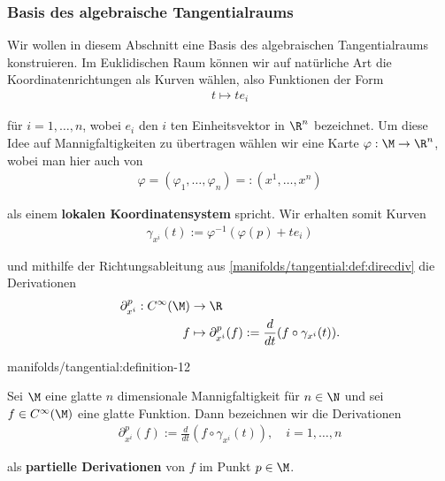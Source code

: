 \documentclass[letterpaper,10pt,german]{jupyterBook}
\begin{document}
\subsubsection{Basis des algebraische Tangentialraums}
\label{\detokenize{manifolds/tangential:basis-des-algebraische-tangentialraums}}\label{\detokenize{manifolds/tangential:sec-tpbasis}}
\par
Wir wollen in diesem Abschnitt eine Basis des algebraischen Tangentialraums konstruieren.
Im Euklidischen Raum können wir auf natürliche Art die Koordinatenrichtungen als Kurven wählen, also Funktionen der Form
\begin{align*}
t \mapsto t e_i
\end{align*}
\par
für \(i=1,\ldots,n\), wobei \(e_i\) den \(i\) ten Einheitsvektor in \(\R^n\) bezeichnet.
Um diese Idee auf Mannigfaltigkeiten zu übertragen wählen wir eine Karte \(\varphi:\M\to\R^n\), wobei man hier auch von
\begin{align*}
\varphi = (\varphi_1,\ldots,\varphi_n) =: (x^1,\ldots,x^n)
\end{align*}
\par
als einem \textbf{lokalen Koordinatensystem} spricht.
Wir erhalten somit Kurven
\begin{align*}
\gamma_{x^i}(t):= \varphi^{-1}(\varphi(p) + t e_i)
\end{align*}
\par
und mithilfe der Richtungsableitung aus \cref{manifolds/tangential:def:direcdiv} die Derivationen
\begin{align*}
\partial_{x^i}^p: C^\infty(\M) &\to \R\\
f &\mapsto \partial_{x^i}^p(f) := \frac{d}{dt} (f\circ \gamma_{x^i}(t)).
\end{align*}\begin{definition}{}{manifolds/tangential:definition-12}



\par
Sei \(\M\) eine glatte \(n\) dimensionale Mannigfaltigkeit für \(n\in\N\) und sei \(f \in C^\infty(\M)\) eine glatte Funktion.
Dann bezeichnen wir die Derivationen
\begin{align*}
\partial_{x^i}^p (f) := \frac{d}{dt} (f\circ \gamma_{x^i}(t)), \quad i=1,\ldots,n
\end{align*}
\par
als \textbf{partielle Derivationen} von \(f\) im Punkt \(p \in \M\).
\end{definition}
\end{document}
